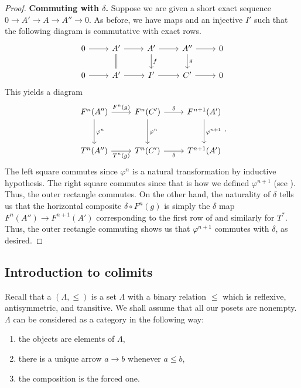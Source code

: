 \documentclass[12pt]{article}
\begin{document}
\begin{proof}
	\textbf{Commuting with $\delta$.} Suppose we are given a short exact sequence $0 \to A' \to A \to A'' \to 0$. As before, we have maps and an injective $I'$ such that the following diagram is commutative with exact rows.
	\begin{equation} \label{eq:07}
		\begin{tikzcd}
			0 \arrow[r] & A' \arrow[r] \arrow[d, equals] & A' \arrow[r] \arrow[d, "f"] & A'' \arrow[r] \arrow[d, "g"] & 0 \\
			0 \arrow[r] & A' \arrow[r] & I' \arrow[r] & C' \arrow[r] & 0
		\end{tikzcd}
	\end{equation}
	This yields a diagram
	\begin{equation*} 
		\begin{tikzcd}[row sep=3em]
			F^{n}(A'') \arrow[d, "\varphi^{n}"] \arrow[r, "F^{n}(g)"] & F^{n}(C') \arrow[d, "\varphi^{n}"] \arrow[r, "\delta"] & F^{n + 1}(A') \arrow[d, "\varphi^{n + 1}"] \\
			T^{n}(A'') \arrow[r, "T^{n}(g)"'] & T^{n}(C') \arrow[r, "\delta"'] & T^{n + 1}(A')
		\end{tikzcd}.
	\end{equation*}
	The left square commutes since $\varphi^{n}$ is a natural transformation by inductive hypothesis. The right square commutes since that is how we defined $\varphi^{n + 1}$ (see ). Thus, the outer rectangle commutes. On the other hand, the naturality of $\delta$ tells us that the horizontal composite $\delta \circ F^{n}(g)$ is simply the $\delta$ map $F^{n}(A'') \to F^{n + 1}(A')$ corresponding to the first row of  and similarly for $T^{\ast}$. Thus, the outer rectangle commuting shows us that $\varphi^{n + 1}$ commutes with $\delta$, as desired.
\end{proof}

\subsection{Introduction to colimits} \label{subsec:introduction-colimits}

Recall that a  $(\Lambda, \le)$ is a set $\Lambda$ with a binary relation $\le$ which is reflexive, antisymmetric, and transitive. We shall assume that all our posets are nonempty. \newline
$\Lambda$ can be considered as a category in the following way:
\begin{enumerate}
	\item the objects are elements of $\Lambda$,
	\item there is a unique arrow $a \to b$ whenever $a \le b$,
	\item the composition is the forced one.
\end{enumerate}
\end{document}
